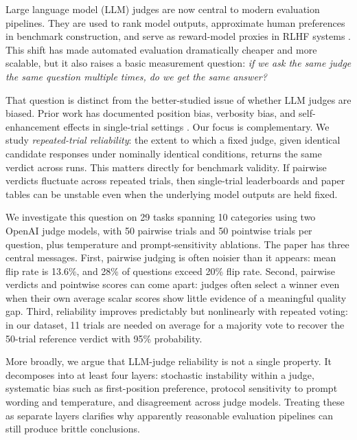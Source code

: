 \documentclass{ijclclp}
\begin{document}
Large language model (LLM) judges are now central to modern evaluation pipelines. They are used to rank model outputs, approximate human preferences in benchmark construction, and serve as reward-model proxies in RLHF systems \citep{zheng2023judging,dubois2024alpacafarm,ouyang2022training,bai2022constitutional}. This shift has made automated evaluation dramatically cheaper and more scalable, but it also raises a basic measurement question: \emph{if we ask the same judge the same question multiple times, do we get the same answer?}

That question is distinct from the better-studied issue of whether LLM judges are biased. Prior work has documented position bias, verbosity bias, and self-enhancement effects in single-trial settings \citep{wang2023large,zheng2023judging,stureborg2024large}. Our focus is complementary. We study \emph{repeated-trial reliability}: the extent to which a fixed judge, given identical candidate responses under nominally identical conditions, returns the same verdict across runs. This matters directly for benchmark validity. If pairwise verdicts fluctuate across repeated trials, then single-trial leaderboards and paper tables can be unstable even when the underlying model outputs are held fixed.

We investigate this question on 29 tasks spanning 10 categories using two OpenAI judge models, with 50 pairwise trials and 50 pointwise trials per question, plus temperature and prompt-sensitivity ablations. The paper has three central messages. First, pairwise judging is often noisier than it appears: mean flip rate is 13.6\%, and 28\% of questions exceed 20\% flip rate. Second, pairwise verdicts and pointwise scores can come apart: judges often select a winner even when their own average scalar scores show little evidence of a meaningful quality gap. Third, reliability improves predictably but nonlinearly with repeated voting: in our dataset, 11 trials are needed on average for a majority vote to recover the 50-trial reference verdict with 95\% probability.

More broadly, we argue that LLM-judge reliability is not a single property. It decomposes into at least four layers: stochastic instability within a judge, systematic bias such as first-position preference, protocol sensitivity to prompt wording and temperature, and disagreement across judge models. Treating these as separate layers clarifies why apparently reasonable evaluation pipelines can still produce brittle conclusions.
\end{document}
